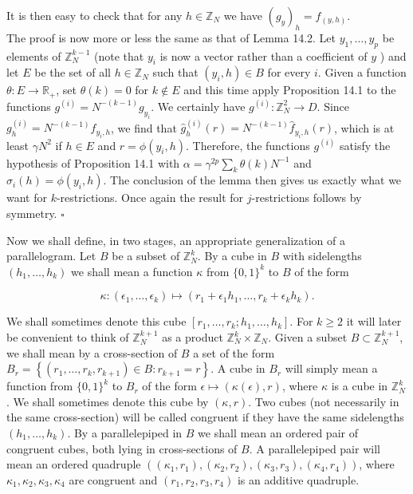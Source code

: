 \documentclass[10pt]{article}
\begin{document}
It is then easy to check that for any $h \in \mathbb{Z}_{N}$ we have $\left(g_{y}\right)_{h}=f_{(y, h)}$.\\
The proof is now more or less the same as that of Lemma 14.2. Let $y_{1}, \ldots, y_{p}$ be elements of $\mathbb{Z}_{N}^{k-1}$ (note that $y_{i}$ is now a vector rather than a coefficient of $y$ ) and let $E$ be the set of all $h \in \mathbb{Z}_{N}$ such that $\left(y_{i}, h\right) \in B$ for every $i$. Given a function $\theta: E \rightarrow \mathbb{R}_{+}$, set $\theta(k)=0$ for $k \notin E$ and this time apply Proposition 14.1 to the functions $g^{(i)}=N^{-(k-1)} g_{y_{i}}$. We certainly have $g^{(i)}: \mathbb{Z}_{N}^{2} \rightarrow D$. Since $g_{h}^{(i)}=N^{-(k-1)} f_{y_{i}, h}$, we find that $\hat{g}_{h}^{(i)}(r)=N^{-(k-1)} \hat{f}_{y_{i}, h}(r)$, which is at least $\gamma N^{2}$ if $h \in E$ and $r=\phi\left(y_{i}, h\right)$. Therefore, the functions $g^{(i)}$ satisfy the hypothesis of Proposition 14.1 with $\alpha=\gamma^{2 p} \sum_{k} \theta(k) N^{-1}$ and $\sigma_{i}(h)=\phi\left(y_{i}, h\right)$. The conclusion of the lemma then gives us exactly what we want for $k$-restrictions. Once again the result for $j$-restrictions follows by symmetry. \(\square\)

Now we shall define, in two stages, an appropriate generalization of a parallelogram. Let $B$ be a subset of $\mathbb{Z}_{N}^{k}$. By a cube in $B$ with sidelengths $\left(h_{1}, \ldots, h_{k}\right)$ we shall mean a function $\kappa$ from $\{0,1\}^{k}$ to $B$ of the form

$$
\kappa:\left(\epsilon_{1}, \ldots, \epsilon_{k}\right) \mapsto\left(r_{1}+\epsilon_{1} h_{1}, \ldots, r_{k}+\epsilon_{k} h_{k}\right) .
$$

We shall sometimes denote this cube $\left[r_{1}, \ldots, r_{k} ; h_{1}, \ldots, h_{k}\right]$. For $k \geqslant 2$ it will later be convenient to think of $\mathbb{Z}_{N}^{k+1}$ as a product $\mathbb{Z}_{N}^{k} \times \mathbb{Z}_{N}$. Given a subset $B \subset \mathbb{Z}_{N}^{k+1}$, we shall mean by a cross-section of $B$ a set of the form $B_{r}=\left\{\left(r_{1}, \ldots, r_{k}, r_{k+1}\right) \in B: r_{k+1}=r\right\}$. A cube in $B_{r}$ will simply mean a function from $\{0,1\}^{k}$ to $B_{r}$ of the form $\epsilon \mapsto(\kappa(\epsilon), r)$, where $\kappa$ is a cube in $\mathbb{Z}_{N}^{k}$. We shall sometimes denote this cube by $(\kappa, r)$. Two cubes (not necessarily in the same cross-section) will be called congruent if they have the same sidelengths $\left(h_{1}, \ldots, h_{k}\right)$. By a parallelepiped in $B$ we shall mean an ordered pair of congruent cubes, both lying in cross-sections of $B$. A parallelepiped pair will mean an ordered quadruple $\left(\left(\kappa_{1}, r_{1}\right),\left(\kappa_{2}, r_{2}\right),\left(\kappa_{3}, r_{3}\right),\left(\kappa_{4}, r_{4}\right)\right)$, where $\kappa_{1}, \kappa_{2}, \kappa_{3}, \kappa_{4}$ are congruent and $\left(r_{1}, r_{2}, r_{3}, r_{4}\right)$ is an additive quadruple.
\end{document}
